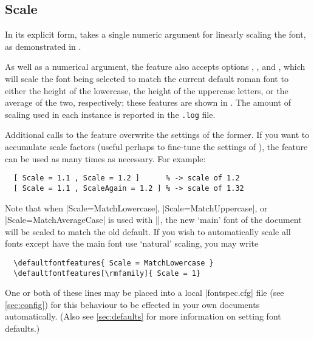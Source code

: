 \documentclass[a4paper]{l3doc}
\begin{document}
 

\subsection{Scale}


In its explicit form,  takes a single
numeric argument for linearly scaling the font, as demonstrated
in .

As well as a numerical argument, the  feature
also accepts options , ,
and , which will scale the font being selected to match
the current default roman font to either the height of the lowercase,
the height of the uppercase letters, or the average of the two,
respectively; these features are shown in .
The amount of scaling used in each instance is reported in the \texttt{.log} file.


Additional calls to the  feature overwrite the settings of the former.
If you want to accumulate scale factors (useful perhaps to fine-tune the settings of
), the  feature can be used as many times as
necessary. For example:
\begin{Verbatim}
  [ Scale = 1.1 , Scale = 1.2 ]      % -> scale of 1.2
  [ Scale = 1.1 , ScaleAgain = 1.2 ] % -> scale of 1.32
\end{Verbatim}

Note that when |Scale=MatchLowercase|, |Scale=MatchUppercase|, or |Scale=MatchAverageCase|
is used with |\setmainfont|, the new `main'
font of the document will be scaled to match the old default.
If you wish to automatically scale all fonts except have the main font use `natural'
scaling, you may write
\begin{Verbatim}
  \defaultfontfeatures{ Scale = MatchLowercase }
  \defaultfontfeatures[\rmfamily]{ Scale = 1}
\end{Verbatim}
One or both of these lines may be placed into a local |fontspec.cfg| file
(see \vref{sec:config}) for this behaviour to be effected in your own documents
automatically.
(Also see \vref{sec:defaults} for more information on setting font defaults.)
\end{document}
